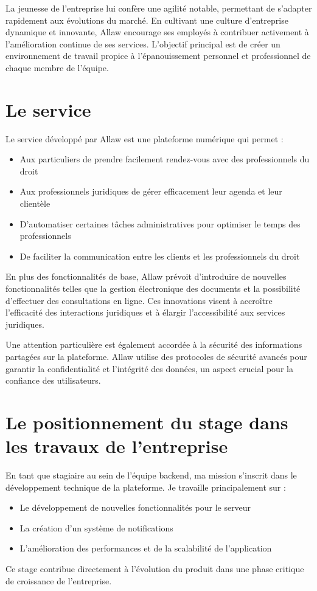 La jeunesse de l'entreprise lui confère une agilité notable, permettant de s'adapter rapidement aux évolutions du marché. En cultivant une culture d'entreprise dynamique et innovante, Allaw encourage ses employés à contribuer activement à l'amélioration continue de ses services. L'objectif principal est de créer un environnement de travail propice à l'épanouissement personnel et professionnel de chaque membre de l'équipe.

\section{Le service} 
Le service développé par Allaw est une plateforme numérique qui permet :
\begin{itemize}
    \item Aux particuliers de prendre facilement rendez-vous avec des professionnels du droit
    \item Aux professionnels juridiques de gérer efficacement leur agenda et leur clientèle
    \item D'automatiser certaines tâches administratives pour optimiser le temps des professionnels
    \item De faciliter la communication entre les clients et les professionnels du droit
\end{itemize}

En plus des fonctionnalités de base, Allaw prévoit d'introduire de nouvelles fonctionnalités telles que la gestion électronique des documents et la possibilité d'effectuer des consultations en ligne. Ces innovations visent à accroître l'efficacité des interactions juridiques et à élargir l'accessibilité aux services juridiques.

Une attention particulière est également accordée à la sécurité des informations partagées sur la plateforme. Allaw utilise des protocoles de sécurité avancés pour garantir la confidentialité et l'intégrité des données, un aspect crucial pour la confiance des utilisateurs.

\section{Le positionnement du stage dans les travaux de l'entreprise} 
En tant que stagiaire au sein de l'équipe backend, ma mission s'inscrit dans le développement technique de la plateforme. Je travaille principalement sur :
\begin{itemize}
    \item Le développement de nouvelles fonctionnalités pour le serveur
    \item La création d'un système de notifications
    \item L'amélioration des performances et de la scalabilité de l'application
\end{itemize}
Ce stage contribue directement à l'évolution du produit dans une phase critique de croissance de l'entreprise.


